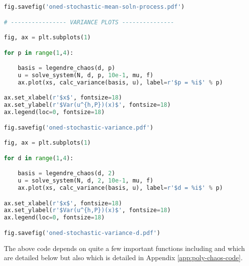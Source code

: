 \begin{lstlisting}[language=Python,
                   caption={Setup code used to obtain results for Chapter
                   \ref{chap:oned-stochastic}},
                   label={code:oned-stochastic-setup}]
fig.savefig('oned-stochastic-mean-soln-process.pdf')

# ---------------- VARIANCE PLOTS ---------------

fig, ax = plt.subplots(1)

for p in range(1,4):

    basis = legendre_chaos(d, p)
    u = solve_system(N, d, p, 10e-1, mu, f)
    ax.plot(xs, calc_variance(basis, u), label=r'$p = %i$' % p)

ax.set_xlabel(r'$x$', fontsize=18)
ax.set_ylabel(r'$Var(u^{h,P})(x)$', fontsize=18)
ax.legend(loc=0, fontsize=18)

fig.savefig('oned-stochastic-variance.pdf')

fig, ax = plt.subplots(1)

for d in range(1,4):

    basis = legendre_chaos(d, 2)
    u = solve_system(N, d, 2, 10e-1, mu, f)
    ax.plot(xs, calc_variance(basis, u), label=r'$d = %i$' % p)

ax.set_xlabel(r'$x$', fontsize=18)
ax.set_ylabel(r'$Var(u^{h,P})(x)$', fontsize=18)
ax.legend(loc=0, fontsize=18)

fig.savefig('oned-stochastic-variance-d.pdf')
\end{lstlisting}

The above code depends on quite a few important functions including
  and  which are
detailed below but also  which is
detailed in Appendix \ref{app:poly-chaos-code}.


